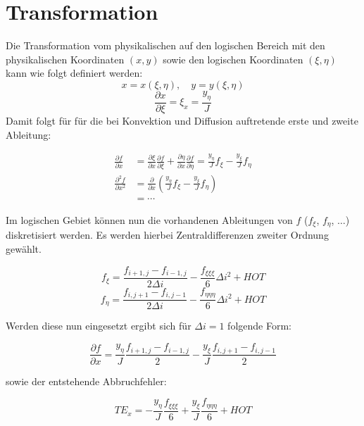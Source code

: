 \documentclass[11pt, ngerman,colorback,accentcolor=tud2d]{tudreport}
\newcommand{\pder}[2][]{\frac{\partial#1}{\partial#2}}
\newcommand{\pderf}[1]{\frac{\partial f}{\partial#1}}
\newcommand{\pderfs}[1]{\frac{\partial^2 f}{\partial#1}}
\begin{document}
\chapter{Transformation}

Die Transformation vom physikalischen auf den logischen Bereich mit
den physikalischen Koordinaten $(x, y)$ sowie den logischen
Koordinaten $(\xi, \eta)$ kann wie folgt definiert werden:
\begin{equation}
  x=x(\xi,\eta),\quad y=y(\xi, \eta)
\end{equation}
\begin{equation}
  \pder[x]{\xi}=\xi_x=\frac{y_{\eta}}{J}
\end{equation}
Damit folgt für für die bei Konvektion und Diffusion auftretende
erste und zweite Ableitung:

\begin{align*}
  \pderf{x}&=\pder[\xi]{x}\pderf{\xi}+\pder[\eta]{x}\pderf{\eta}
  =\frac{y_{\eta}}{J} f_{\xi} - \frac{y_{\xi}}{J}f_{\eta}\\
  \pderfs{x^2} &= \pder{x}\left({\frac{y_{\eta}}{J} f_{\xi} - \frac{y_{\xi}}{J}f_{\eta}}\right)\\
               &= \cdots
\end{align*}


Im logischen Gebiet können nun die vorhandenen Ableitungen von $f$
($f_{\xi}$, $f_{\eta}$, $\dots$) diskretisiert werden.
Es werden hierbei Zentraldifferenzen zweiter Ordnung gewählt.

\begin{equation}
  f_{\xi}=\frac{f_{i+1,j}-f_{i-1,j}}{2\Delta i} - \frac{f_{\xi\xi\xi}}{6}\Delta i^2 + HOT
\end{equation}
\begin{equation}
  f_{\eta}=\frac{f_{i,j+1}-f_{i,j-1}}{2 \Delta i} - \frac{f_{\eta\eta\eta}}{6}\Delta i^2 + HOT
\end{equation}

Werden diese nun eingesetzt ergibt sich für $\Delta i = 1$ folgende Form:

\begin{equation}
  \pderf{x}=\frac{y_{\eta}}{J}\frac{f_{i+1,j}-f_{i-1,j}}{2}
  - \frac{y_{\xi}}{J}\frac{f_{i,j+1}-f_{i,j-1}}{2}
\end{equation}

sowie der entstehende Abbruchfehler:

\begin{equation}
  TE_x = -\frac{y_{\eta}}{J}\frac{f_{\xi\xi\xi}}{6}
  + \frac{y_{\xi}}{J}\frac{f_{\eta\eta\eta}}{6}+HOT
\end{equation}
\end{document}
